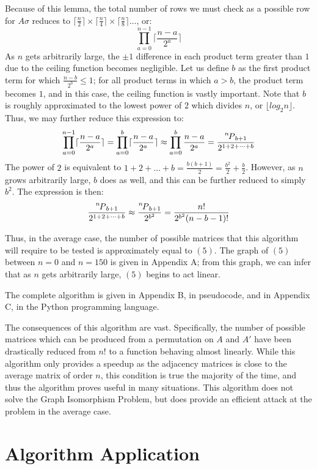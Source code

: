 \documentclass[12pt]{article}
\newcommand\permute[2][n]{\prescript{#1\mkern-2.5mu}{}P_{#2}}
\begin{document}
Because of this lemma, the total number of rows we must check as a possible row for $A \sigma$ reduces to $\lceil\frac{n}{2}\rceil \times \lceil\frac{n}{4}\rceil \times \lceil\frac{n}{8}\rceil \dots$, or: 
$$\prod_{a=0}^{n-1} \lceil\frac{n-a}{2^a}\rceil$$
 As $n$ gets arbitrarily large, the $\pm 1$ difference in each product term greater than $1$ due to the ceiling function becomes negligible. Let us define $b$ as the first product term for which $\frac{n-b}{2^b} \leq 1$; for all product terms in which $a>b$, the product term becomes $1$, and in this case, the ceiling function is vastly important. Note that $b$ is roughly approximated to the lowest power of $2$ which divides $n$, or $\lfloor log_2 n \rfloor$. Thus, we may further reduce this expression to: 
 $$\prod_{a=0}^{n-1} \lceil\frac{n-a}{2^a}\rceil = \prod_{a=0}^{b} \lceil\frac{n-a}{2^a}\rceil \approx \prod_{a=0}^{b} \frac{n-a}{2^a}  = \frac{\permute{b+1}}{2^{1+2+ \dots +b}} $$
The power of $2$ is equivalent to $1 + 2 + \dots +b = \frac{b(b+1)}{2} = \frac{b^2}{2} + \frac{b}{2}$. However, as $n$ grows arbitrarily large, $b$ does as well, and this can be further reduced to simply $b^2$. The expression is then:
\begin{equation}
\frac{\permute{b+1}}{2^{1+2+ \dots +b}} \approx \frac{\permute{b+1}}{2^{b^2}} = \frac{n!}{2^{b^2} (n-b-1)!}
\end{equation}

Thus, in the average case, the number of possible matrices that this algorithm will require to be tested is approximately equal to $(5)$. The graph of $(5)$ between $n=0$ and $n=150$ is given in Appendix A; from this graph, we can infer that as $n$ gets arbitrarily large, $(5)$ begins to act linear.

The complete algorithm is given in Appendix B, in pseudocode, and in Appendix C, in the Python programming language.

The consequences of this algorithm are vast. Specifically, the number of possible matrices which can be produced from a permutation on $A$ and $A'$ have been drastically reduced from $n!$ to a function behaving almost linearly. While this algorithm only provides a speedup as the adjacency matrices is close to the average matrix of order $n$, this condition is true the majority of the time, and thus the algorithm proves useful in many situations. This algorithm does not solve the Graph Isomorphism Problem, but does provide an efficient attack at the problem in the average case.
\newpage

\section{Algorithm Application}
\end{document}
